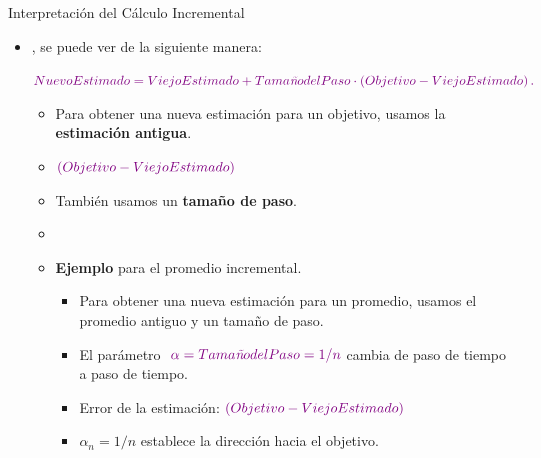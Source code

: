 \documentclass[10pt, envcountsect, handout, aspectratio=1610, hyperref={hypertexnames=true}]{beamer}
\begin{document}
\begin{frame}{Interpretación del Cálculo Incremental}
\begin{itemize}
{{		
		}}
		
		
		
		\item {}, se puede ver de la siguiente manera:
		
		\centerline{\normalsize  $\color{violet} {Nuevo Estimado} = {Viejo Estimado} + {Tama\text{\itñ}o del Paso} \cdot \left( {Objetivo} - {Viejo Estimado} \right).$}
		
		\begin{itemize}
			\item Para obtener una nueva estimación para un objetivo, usamos la \textbf{estimación antigua}. 
			
			\item[]\qquad {} $\color{violet} \left( {Objetivo} - {Viejo Estimado} \right)$ 
			
			\item También usamos  un \textbf{tamaño de paso}.
			\item[]\qquad {}
			
			\item \textbf{Ejemplo} para el promedio incremental.
			
			\begin{itemize}
				\item Para obtener una nueva estimación para un promedio,  usamos el promedio antiguo y un tamaño de paso.
				\item El parámetro  $\color{violet} \alpha=Tama\text{\itñ}o del Paso = 1/n$ cambia de paso de tiempo a paso de tiempo.
				\item Error de la estimación: $\color{violet} \left( {Objetivo} - {Viejo Estimado} \right)$ 
				\item $\alpha_n=1/n$ establece la dirección hacia el objetivo.
			\end{itemize}
		\end{itemize}
		
	\end{itemize}
	
\end{frame}
\end{document}
